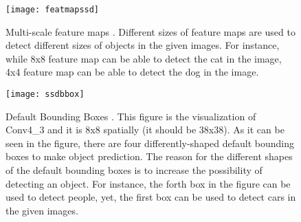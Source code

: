\documentclass{article}
\begin{document}
\begin{figure}
    \centering
    \texttt{[image: featmapssd]}
    \caption{Multi-scale feature maps \cite{ssdcite}. Different sizes of feature maps 
    are used to detect different sizes of objects in the given images. 
    For instance, while 8x8 feature map can be able to detect the cat in 
    the image, 4x4 feature map can be able to detect the dog in the image.}
    \label{fig:featmapssd1}
\end{figure}

\begin{figure}
    \centering
    \texttt{[image: ssdbbox]}
    \caption{Default Bounding Boxes \cite{jonhui}. This figure is the visualization of 
    Conv4\_3 and it is 8x8 spatially (it should be 38x38). As it can be seen in the figure, 
    there are four differently-shaped default bounding boxes to make object prediction. The 
    reason for the different shapes of the default bounding boxes is to increase the 
    possibility of detecting an object. For instance, the forth box in the figure can be used 
    to detect people, yet, the first box can be used to detect cars in the given images.}
    \label{fig:ssdbbox1}
\end{figure}
\end{document}

